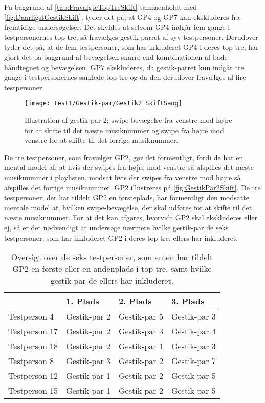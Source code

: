 \noindent
%
På baggrund af \autoref{tab:FravalgteTopTreSkift} sammenholdt med \autoref{fig:DaarligstGestikSkift}, tyder det på, at GP4 og GP7 kan ekskluderes fra fremtidige undersøgelser. Det skyldes at selvom GP4 indgår fem gange i testpersonernes top tre, så fravælges gestik-parret af syv testpersoner. Derudover tyder det på, at de fem testpersoner, som har inkluderet GP4 i deres top tre, har gjort det på baggrund af bevægelsen snarre end kombinationen af både håndtegnet og bevægelsen. GP7 ekskluderes, da gestik-parret kun indgår tre gange i testpersonernes samlede top tre og da den derudover fravælges af fire testpersoner. 
%
\begin{figure}[H]
	\centering
	\texttt{[image: Test1/Gestik-par/Gestik2\_SkiftSang]}
	\caption{Illustration af gestik-par 2; swipe-bevægelse fra venstre mod højre for at skifte til det næste musiknummer og swipe fra højre mod venstre for at skifte til det forrige musiknummer.}
	\label{fig:GestikPar2Skift}
\end{figure}
\noindent
%
De tre testpersoner, som fravælger GP2, gør det formentligt, fordi de har en mental model af, at hvis der swipes fra højre mod venstre så afspilles det næste musiknummer i playlisten, modsat hvis der swipes fra venstre mod højre så afspilles det forrige musiknummer. GP2 illustreres på \autoref{fig:GestikPar2Skift}. De tre testpersoner, der har tildelt GP2 en førsteplads, har formentligt den modsatte mentale model af, hvilken swipe-bevægelse, der skal udføres for at skifte til det næste musiknummer. For at det kan afgøres, hvorvidt GP2 skal ekskluderes eller ej, så er det nødvendigt at undersøge nærmere hvilke gestik-par de seks testpersoner, som har inkluderet GP2 i deres top tre, ellers har inkluderet. 
%
\begin{table}[H]
	\centering
	\begin{tabular}{ | p{3cm} | p{3cm} | p{3cm} | p{3cm} |}
	\hline
		 & 1. Plads & 2. Plads & 3. Plads \\ \hline
		Testperson 4 & Gestik-par 2 & Gestik-par 5 & Gestik-par 3 \\ \hline
		Testperson 17 & Gestik-par 2 & Gestik-par 3 & Gestik-par 4 \\ \hline
		Testperson 18 & Gestik-par 2 & Gestik-par 1 & Gestik-par 3 \\ \hline
		Testperson 8 & Gestik-par 3 & Gestik-par 2 & Gestik-par 7 \\ \hline
		Testperson 12 & Gestik-par 1 & Gestik-par 2 & Gestik-par 5\\ \hline
		Testperson 15 & Gestik-par 1 & Gestik-par 2 & Gestik-par 5 \\ \hline
	\end{tabular}
	\caption{Oversigt over de seks testpersoner, som enten har tildelt GP2 en første eller en andenplads i top tre, samt hvilke gestik-par de ellers har inkluderet.}
	\label{tab:GestikPar2ITopTre}
\end{table}
